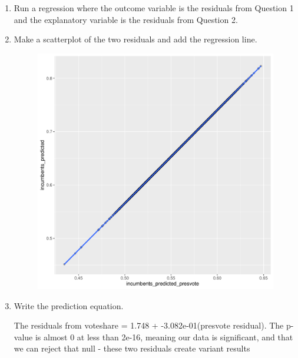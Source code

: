\documentclass[12pt,letterpaper]{article}
\begin{document}
	\begin{enumerate}
		\item Run a regression where the outcome variable is the residuals from Question 1 and the explanatory variable is the residuals from Question 2.
			
			\vspace{5cm}
		\item Make a scatterplot of the two residuals and add the regression line. 
		\begin{figure}[h!]\centering
			\caption{\footnotesize
			}\vspace{-1cm}
			\includegraphics[width=.75\textwidth]{plot_Q4.pdf}\\
		\end{figure}
	
		\item Write the prediction equation.
		
The residuals from voteshare = 1.748 + -3.082e-01(presvote residual). The p-value is almost 0 at less than 2e-16, meaning our data is significant, and that we can reject that null - these two residuals create variant results
	
	\end{enumerate}
	
	\newpage	
\end{document}
